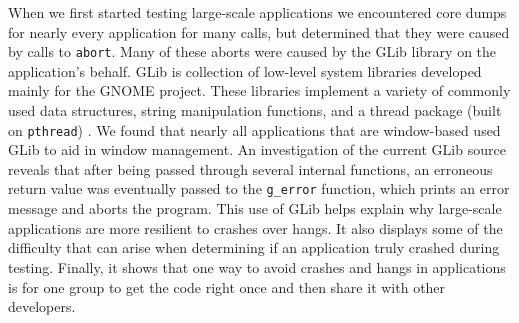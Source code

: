 When we first started testing large-scale applications we encountered core dumps for nearly every application for many calls, but determined that they were caused by calls to \texttt{abort}. Many of these aborts were caused by the GLib library on the application's behalf. GLib is collection of low-level system libraries developed mainly for the GNOME project. These libraries implement a variety of commonly used data structures, string manipulation functions, and a thread package (built on \texttt{pthread}) \cite{glibman}. We found that nearly all applications that are window-based used GLib to aid in window management. An investigation of the current GLib source reveals that after being passed through several internal functions, an erroneous return value was eventually passed to the \texttt{g\_error} function, which prints an error message and aborts the program. This use of GLib helps explain why large-scale applications are more resilient to crashes over hangs. It also displays some of the difficulty that can arise when determining if an application truly crashed during testing. Finally, it shows that one way to avoid crashes and hangs in applications is for one group to get the code right once and then share it with other developers.



